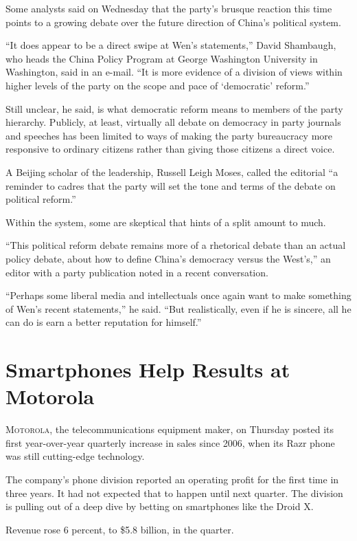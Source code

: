 ﻿\documentclass[12pt]{article}
\begin{document}
Some analysts said on Wednesday that the party's brusque reaction this time points to a growing
debate over the future direction of China's political system.

``It does appear to be a direct swipe at Wen's statements,'' David Shambaugh, who heads the China
Policy Program at George Washington University in Washington, said in an e-mail. ``It is more
evidence of a division of views within higher levels of the party on the scope and pace of
`democratic' reform.''

Still unclear, he said, is what democratic reform means to members of the party hierarchy. Publicly,
at least, virtually all debate on democracy in party journals and speeches has been limited to ways
of making the party bureaucracy more responsive to ordinary citizens rather than giving those
citizens a direct voice.

A Beijing scholar of the leadership, Russell Leigh Moses, called the editorial ``a reminder to
cadres that the party will set the tone and terms of the debate on political reform.''

Within the system, some are skeptical that hints of a split amount to much.

``This political reform debate remains more of a rhetorical debate than an actual policy debate,
about how to define China's democracy versus the West's,'' an editor with a party publication noted
in a recent conversation.

``Perhaps some liberal media and intellectuals once again want to make something of Wen's recent
statements,'' he said. ``But realistically, even if he is sincere, all he can do is earn a better
reputation for himself.''

\section{Smartphones Help Results at Motorola}

\lettrine{M}{otorola}, the telecommunications equipment maker, on Thursday
posted its first year-over-year quarterly increase in sales since 2006, when its Razr phone was
still cutting-edge technology.

The company's phone division reported an operating profit for the first time in three years. It had
not expected that to happen until next quarter. The division is pulling out of a deep dive by
betting on smartphones like the Droid X.

Revenue rose 6 percent, to \$5.8 billion, in the quarter.
\end{document}
